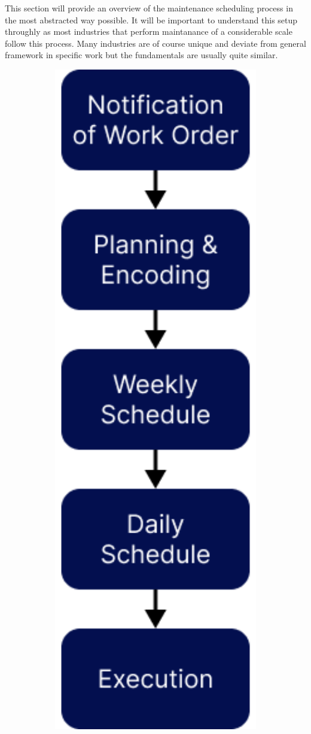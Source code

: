 This section will provide an overview of the maintenance scheduling process in the most abstracted way possible. It will be important to understand this setup
throughly as most industries that perform maintanance of a considerable scale follow this process. Many industries are of course unique and deviate
from general framework in specific work but the fundamentals are usually quite similar. 

\begin{figure}
\includegraphics[width=1.0\textwidth]{../figures/top-level-schedule-overview.png}
\label{top-level-schedule-overview.png}
\end{figure}


